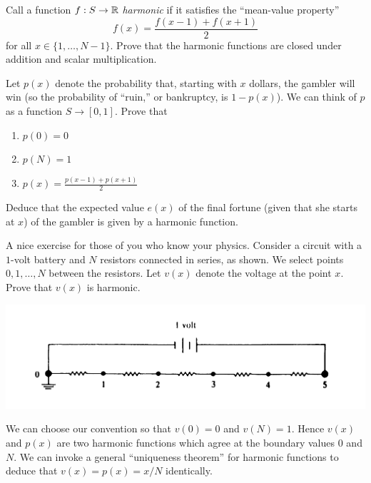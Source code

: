 \documentclass{article}
\begin{document}
\begin{exercise}
Call a function $f:S\to \mathbb{R}$ \emph{harmonic} if it satisfies the ``mean-value property'' 
\[f(x)=\frac{f(x-1)+f(x+1)}{2}\] for all $x\in \{1,\dots,N-1\}$. Prove that the harmonic functions are closed under addition and scalar multiplication. 
\end{exercise}

\begin{exercise}
Let $p(x)$ denote the probability that, starting with $x$ dollars, the gambler will win (so the probability of ``ruin,'' or bankruptcy, is $1-p(x)$). We can think of $p$ as a function $S\to [0,1]$. Prove that 
\begin{enumerate}[label=\textbf{(\alph*)}]
    \item $p(0)=0$
    \item $p(N)=1$
    \item $p(x) = \frac{p(x-1)+p(x+1)}{2}$
\end{enumerate}
Deduce that the expected value $e(x)$ of the final fortune (given that she starts at $x$) of the gambler is given by a harmonic function.
\end{exercise}

\begin{exercise}
A nice exercise for those of you who know your physics. Consider a circuit with a $1$-volt battery and $N$ resistors connected in series, as shown. We select points $0,1,\dots,N$ between the resistors. Let $v(x)$ denote the voltage at the point $x$. Prove that $v(x)$ is harmonic.
\end{exercise}

\includegraphics[scale=0.5]{Pics/Screen Shot 2022-04-04 at 6.51.21 AM.png}

\begin{remark}
We can choose our convention so that $v(0)=0$ and $v(N)=1$. Hence $v(x)$ and $p(x)$ are two harmonic functions which agree at the boundary values $0$ and $N$. We can invoke a general ``uniqueness theorem'' for harmonic functions to deduce that $v(x)=p(x)=x/N$ identically. 
\end{remark}
\end{document}
